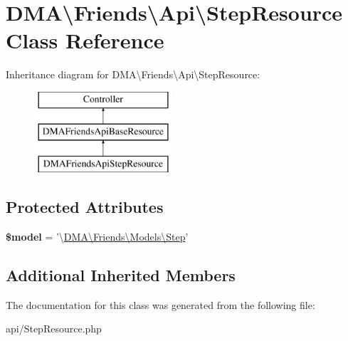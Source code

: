 \hypertarget{classDMA_1_1Friends_1_1Api_1_1StepResource}{\section{D\+M\+A\textbackslash{}Friends\textbackslash{}Api\textbackslash{}Step\+Resource Class Reference}
\label{classDMA_1_1Friends_1_1Api_1_1StepResource}
}
Inheritance diagram for D\+M\+A\textbackslash{}Friends\textbackslash{}Api\textbackslash{}Step\+Resource\+:\begin{figure}[H]
\begin{center}
\leavevmode
\includegraphics[height=3.000000cm]{d8/da8/classDMA_1_1Friends_1_1Api_1_1StepResource}
\end{center}
\end{figure}
\subsection*{Protected Attributes}
\begin{DoxyCompactItemize}
\item 
\hypertarget{classDMA_1_1Friends_1_1Api_1_1StepResource_a96b8c504a8e7c87634d2d33873bb9ac3}{{\bfseries \$model} = '\textbackslash{}\hyperlink{classDMA_1_1Friends_1_1Models_1_1Step}{D\+M\+A\textbackslash{}\+Friends\textbackslash{}\+Models\textbackslash{}\+Step}'}\label{classDMA_1_1Friends_1_1Api_1_1StepResource_a96b8c504a8e7c87634d2d33873bb9ac3}

\end{DoxyCompactItemize}
\subsection*{Additional Inherited Members}


The documentation for this class was generated from the following file\+:\begin{DoxyCompactItemize}
\item 
api/Step\+Resource.\+php\end{DoxyCompactItemize}
